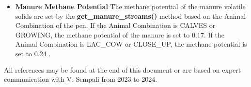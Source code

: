 \begin{refsection}
\begin{itemize}
            {\raggedleft \textbf{[AN.EXC.33]}\par}
            \vspace{0.5cm}

Manure P excreted by a cow (g/d)
        \vspace{0.5cm}
    
    \begin{center}
        \(manure\_phosphorus\_excreted = fecal\_phosphorus + urine\_phosphorus\_required\)
    \end{center}
        \vspace{0.5cm} 
    
            {\raggedleft \textbf{[AN.EXC.34]}\par}
            \vspace{0.5cm}

Total P excreted by a cow (g/d)
        \vspace{0.5cm}
    
    \begin{center}
        \(total\_phosphorus\_excreted = phosphorus\_in\_milk + fecal\_phosphorus  + urine\_phosphorus\_required\)
    \end{center}
        \vspace{0.5cm} 
    
            {\raggedleft \textbf{[AN.EXC.35]}\par}
            \vspace{0.5cm}


\item \textbf{Manure Methane Potential}
  The methane potential of the manure volatile solids are set by the \textbf{get\_manure\_streams()} method based on the Animal Combination of the pen. If the Animal Combination is CALVES or GROWING, the methane potential of the manure is set to 0.17. If the Animal Combination is LAC\_COW or CLOSE\_UP, the methane potential is set to 0.24 \parencite{Hanson2024}.
    
    \end{itemize}
 

\begin{tcolorbox}[colback=white, colframe=black, title=Important Note]
All references may be found at the end of this document or are based on expert communication with V. Sempali from 2023 to 2024. 
\end{tcolorbox}
\nocite{reed2015} \nocite{nennich2005}\nocite{asabe2005} \nocite{johnson2016} \nocite{appuhamy2014}\nocite{appuhamy2018}\nocite{vadas2007} \nocite{nrc2001}\nocite{nrc2021}\nocite{wilkerson1997prediction}\nocite{boadi2004}\nocite{deboer2002a}\nocite{monteny2002b}


\end{refsection}

